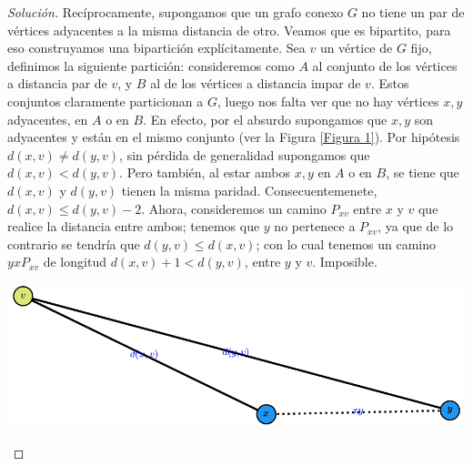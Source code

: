 \documentclass[12pt]{report}
\theoremstyle{plain}
\theoremstyle{definition}
\newenvironment{solution}{\begin{proof}[Solución]}{\end{proof}}
\begin{document}
\begin{solution}
Recíprocamente, supongamos que un grafo conexo $G$ no tiene un par de vértices adyacentes a la misma distancia de otro. Veamos que es bipartito, para eso construyamos una bipartición explícitamente. Sea $v$ un vértice de $G$ fijo, definimos la siguiente partición: consideremos como $A$ al conjunto de los vértices a distancia par de $v$, y $B$ al de los vértices a distancia impar de $v$. Estos conjuntos claramente particionan a $G$, luego nos falta ver que no hay vértices $x,y$ adyacentes, en $A$ o en $B$. En efecto, por el absurdo supongamos que $x,y$ son adyacentes y están en el mismo conjunto (ver la Figura \ref{Figura 1}). Por hipótesis $d(x,v) \neq d(y,v) $, sin pérdida de generalidad supongamos que $d (x,v) < d (y,v)$. Pero también, al estar ambos $x,y$ en $A$ o en $B$, se tiene que $d (x,v)$ y $d ( y,v)$ tienen la misma paridad. Consecuentemenete, $d (x,v) \leq d(y,v) - 2$. Ahora, consideremos un camino $P_{xv}$ entre $x$ y $v$ que realice la distancia entre ambos; tenemos que $y$ no pertenece a $P_{xv}$, ya que de lo contrario se tendría que $d (y,v) \leq d (x,v)$; con lo cual tenemos un camino $yx P_{xv}$ de longitud $d (x,v) +1 < d (y,v)$, entre $y$ y $v$. Imposible.

\begin{center}
\includegraphics{"./Dibujo 1.pdf"}\label{Figura 1}
\end{center}

\end{solution}
\end{document}
